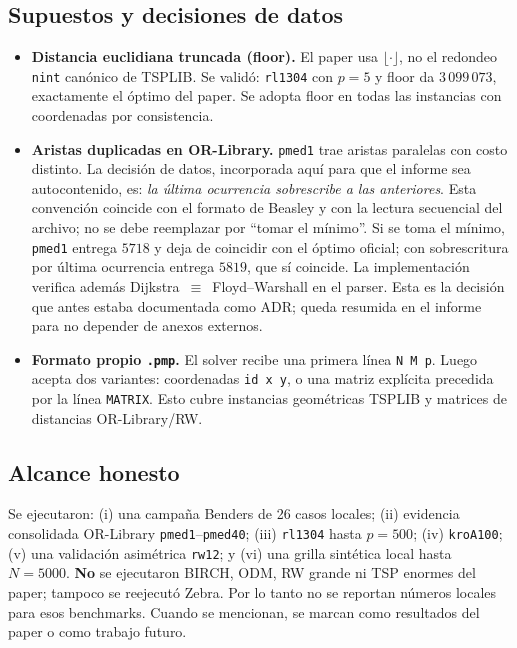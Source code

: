 \subsection{Supuestos y decisiones de datos}
\begin{itemize}[noitemsep]
  \item \textbf{Distancia euclidiana truncada (floor).} El paper usa $\lfloor\cdot\rfloor$, no el
        redondeo \texttt{nint} canónico de TSPLIB. Se validó: \texttt{rl1304} con $p=5$ y floor da
        $3\,099\,073$, exactamente el óptimo del paper. Se adopta floor en todas las instancias
        con coordenadas por consistencia.
  \item \textbf{Aristas duplicadas en OR-Library.} \texttt{pmed1} trae aristas paralelas con costo
        distinto. La decisión de datos, incorporada aquí para que el informe sea autocontenido, es:
        \emph{la última ocurrencia sobrescribe a las anteriores}. Esta convención coincide con el
        formato de Beasley y con la lectura secuencial del archivo; no se debe reemplazar por
        ``tomar el mínimo''. Si se toma el mínimo, \texttt{pmed1} entrega $5718$ y deja de coincidir
        con el óptimo oficial; con sobrescritura por última ocurrencia entrega $5819$, que sí
        coincide. La implementación verifica además Dijkstra~$\equiv$~Floyd--Warshall en el
        parser. Esta es la decisión que antes estaba documentada como ADR; queda resumida en el
        informe para no depender de anexos externos.
  \item \textbf{Formato propio \texttt{.pmp}.} El solver recibe una primera línea \texttt{N M p}.
        Luego acepta dos variantes: coordenadas \texttt{id x y}, o una matriz explícita precedida
        por la línea \texttt{MATRIX}. Esto cubre instancias geométricas TSPLIB y matrices de
        distancias OR-Library/RW.
\end{itemize}

\subsection{Alcance honesto}
Se ejecutaron: (i) una campaña Benders de 26 casos locales; (ii) evidencia consolidada
OR-Library \texttt{pmed1}--\texttt{pmed40}; (iii) \texttt{rl1304} hasta $p=500$; (iv)
\texttt{kroA100}; (v) una validación asimétrica \texttt{rw12}; y (vi) una grilla sintética local
hasta $N=5000$. \textbf{No} se ejecutaron BIRCH, ODM, RW grande ni TSP enormes del paper; tampoco
se reejecutó Zebra. Por lo tanto no se reportan números locales para esos benchmarks. Cuando se
mencionan, se marcan como resultados del paper o como trabajo futuro.
